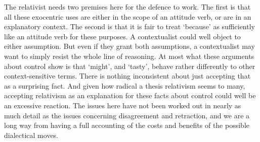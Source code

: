 The relativist needs two premises here for the defence to work. The first is that all these exocentric uses are either in the scope of an attitude verb, or are in an explanatory context. The second is that it is fair to treat `because' as sufficiently like an attitude verb for these purposes. A contextualist could well object to either assumption. But even if they grant both assumptions, a contextualist may want to simply resist the whole line of reasoning. At most what these arguments about control show is that `might', and `tasty', behave rather differently to other context-sensitive terms. There is nothing inconsistent about just accepting that as a surprising fact. And given how radical a thesis relativism seems to many, accepting relativism as an explanation for these facts about control could well be an excessive reaction. The issues here have not been worked out in nearly as much detail as the issues concerning disagreement and retraction, and we are a long way from having a full accounting of the costs and benefits of the possible dialectical moves.
